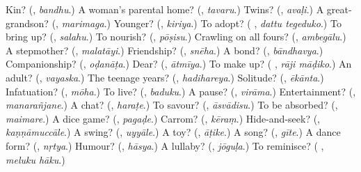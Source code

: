 \begin{tcolorbox}[breakable,colback=teal!4,colframe=teal!35!black,title={Before you move on}]
Kin? (\textbf{}, \emph{bandhu}.) A woman's parental home? (\textbf{}, \emph{tavaru}.) Twins? (\textbf{}, \emph{avaḷi}.) A great-grandson? (\textbf{}, \emph{marimaga}.) Younger? (\textbf{}, \emph{kiriya}.) To adopt? (\textbf{ }, \emph{dattu tegeduko}.) To bring up? (\textbf{}, \emph{salahu}.) To nourish? (\textbf{}, \emph{pōṣisu}.) Crawling on all fours? (\textbf{}, \emph{ambegālu}.) A stepmother? (\textbf{}, \emph{malatāyi}.) Friendship? (\textbf{}, \emph{snēha}.) A bond? (\textbf{}, \emph{bāndhavya}.) Companionship? (\textbf{}, \emph{oḍanāṭa}.) Dear? (\textbf{}, \emph{ātmīya}.) To make up? (\textbf{ }, \emph{rāji māḍiko}.) An adult? (\textbf{}, \emph{vayaska}.) The teenage years? (\textbf{}, \emph{hadihareya}.) Solitude? (\textbf{}, \emph{ēkānta}.) Infatuation? (\textbf{}, \emph{mōha}.) To live? (\textbf{}, \emph{baduku}.) A pause? (\textbf{}, \emph{virāma}.) Entertainment? (\textbf{}, \emph{manarañjane}.) A chat? (\textbf{}, \emph{haraṭe}.) To savour? (\textbf{}, \emph{āsvādisu}.) To be absorbed? (\textbf{}, \emph{maimare}.) A dice game? (\textbf{}, \emph{pagaḍe}.) Carrom? (\textbf{}, \emph{kēraṃ}.) Hide-and-seek? (\textbf{}, \emph{kaṇṇāmuccāle}.) A swing? (\textbf{}, \emph{uyyāle}.) A toy? (\textbf{}, \emph{āṭike}.) A song? (\textbf{}, \emph{gīte}.) A dance form? (\textbf{}, \emph{nṛtya}.) Humour? (\textbf{}, \emph{hāsya}.) A lullaby? (\textbf{}, \emph{jōguḷa}.) To reminisce? (\textbf{ }, \emph{meluku hāku}.)
\end{tcolorbox}
